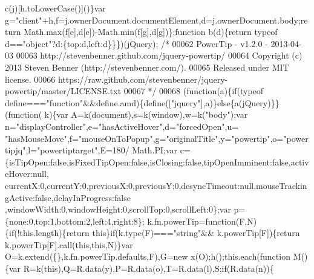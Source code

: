 \begin{DoxyCode}
{      c(j)[h.toLowerCase()]()\}var g=\textcolor{stringliteral}{"client"}+h,f=j.ownerDocument.documentElement,d=j.ownerDocument.body;\textcolor{keywordflow}{return} 
      Math.max(f[e],d[e])-Math.min(f[g],d[g])\};\textcolor{keyword}{function} b(d)\{\textcolor{keywordflow}{return} typeof d==\textcolor{stringliteral}{"object"}?d:\{top:d,left:d\}\}\})(jQuery);\textcolor{comment}{
      /*}
00062 \textcolor{comment}{ PowerTip - v1.2.0 - 2013-04-03}
00063 \textcolor{comment}{ http://stevenbenner.github.com/jquery-powertip/}
00064 \textcolor{comment}{ Copyright (c) 2013 Steven Benner (http://stevenbenner.com/).}
00065 \textcolor{comment}{ Released under MIT license.}
00066 \textcolor{comment}{ https://raw.github.com/stevenbenner/jquery-powertip/master/LICENSE.txt}
00067 \textcolor{comment}{*/}
00068 (\textcolor{keyword}{function}(a)\{\textcolor{keywordflow}{if}(typeof define===\textcolor{stringliteral}{"function"}&&define.amd)\{define([\textcolor{stringliteral}{"jquery"}],a)\}\textcolor{keywordflow}{else}\{a(jQuery)\}\}(\textcolor{keyword}{function}(
      k)\{var A=k(document),s=k(window),w=k(\textcolor{stringliteral}{"body"});var n=\textcolor{stringliteral}{"displayController"},e=\textcolor{stringliteral}{"hasActiveHover"},d=\textcolor{stringliteral}{"forcedOpen"},u=\textcolor{stringliteral}{
      "hasMouseMove"},f=\textcolor{stringliteral}{"mouseOnToPopup"},g=\textcolor{stringliteral}{"originalTitle"},y=\textcolor{stringliteral}{"powertip"},o=\textcolor{stringliteral}{"powertipjq"},l=\textcolor{stringliteral}{"powertiptarget"},E=180/
      Math.PI;var c=\{isTipOpen:\textcolor{keyword}{false},isFixedTipOpen:\textcolor{keyword}{false},isClosing:\textcolor{keyword}{false},tipOpenImminent:\textcolor{keyword}{false},activeHover:null,
      currentX:0,currentY:0,previousX:0,previousY:0,desyncTimeout:null,mouseTrackingActive:\textcolor{keyword}{false},delayInProgress:\textcolor{keyword}{false}
      ,windowWidth:0,windowHeight:0,scrollTop:0,scrollLeft:0\};var p=\{none:0,top:1,bottom:2,left:4,right:8\};
      k.fn.powerTip=\textcolor{keyword}{function}(F,N)\{\textcolor{keywordflow}{if}(!this.length)\{\textcolor{keywordflow}{return} \textcolor{keyword}{this}\}\textcolor{keywordflow}{if}(k.type(F)===\textcolor{stringliteral}{"string"}&&
      k.powerTip[F])\{\textcolor{keywordflow}{return} k.powerTip[F].call(\textcolor{keyword}{this},\textcolor{keyword}{this},N)\}var O=k.extend(\{\},k.fn.powerTip.defaults,F),G=\textcolor{keyword}{new} 
      x(O);h();this.each(\textcolor{keyword}{function} M()\{var R=k(\textcolor{keyword}{this}),Q=R.data(y),P=R.data(o),T=R.data(l),S;\textcolor{keywordflow}{if}(R.data(n))\{
}
\end{DoxyCode}
